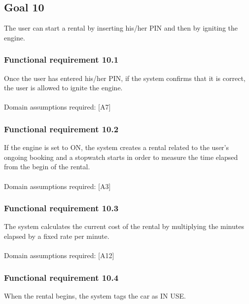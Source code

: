 \subsection{Goal 10}
The user can start a rental by inserting his/her PIN and then by igniting the engine.

\setcounter{secnumdepth}{3}
\subsubsection{Functional requirement 10.1}
Once the user has entered his/her PIN, if the system confirms that it is correct, the user is allowed to ignite the engine.\\~\\
\noindent Domain assumptions required: [A7]

\subsubsection{Functional requirement 10.2}
If the engine is set to ON, the system creates a rental related to the user's ongoing booking and a stopwatch starts in order to measure the time elapsed from the begin of the rental.\\~\\
\noindent Domain assumptions required: [A3]

\subsubsection{Functional requirement 10.3}
The system calculates the current cost of the rental by multiplying the minutes elapsed by a fixed rate per minute.\\~\\
\noindent Domain assumptions required: [A12]

\subsubsection{Functional requirement 10.4}
When the rental begins, the system tags the car as IN USE.
